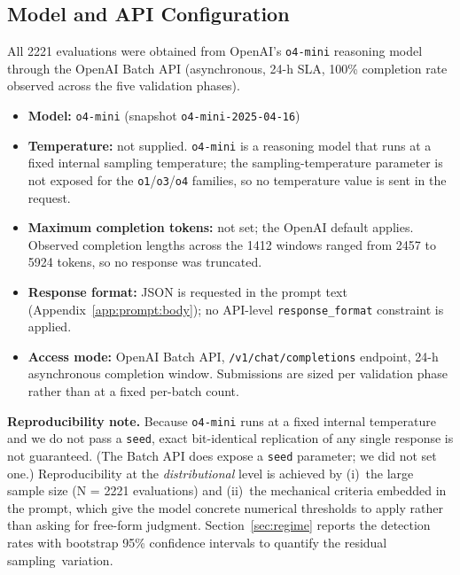 \documentclass[jrfm,article,accept,moreauthors,pdftex]{Definitions/mdpi}
\begin{document}
\subsection{Model and API Configuration}
\label{app:prompt:config}

All 2221 evaluations were obtained from OpenAI's \texttt{o4-mini}
reasoning model through the OpenAI Batch API (asynchronous, 24-h SLA,
100\% completion rate observed across the five validation phases).



\begin{itemize}
    \item \textbf{Model:} \texttt{o4-mini} (snapshot
          \texttt{o4-mini-2025-04-16})
    \item \textbf{Temperature:} not supplied. \texttt{o4-mini} is a
          reasoning model that runs at a fixed internal sampling
          temperature; the sampling-temperature parameter is not
          exposed for the \texttt{o1}/\texttt{o3}/\texttt{o4} families,
          so no temperature value is sent in the request.
    \item \textbf{Maximum completion tokens:} not set; the OpenAI
          default applies. Observed completion lengths across the
          1412 windows ranged from 2457 to 5924 tokens, so no response
          was truncated.
    \item \textbf{Response format:} JSON is requested in the prompt
          text (Appendix~\ref{app:prompt:body}); no API-level
          \texttt{response\_format} constraint is applied.
    \item \textbf{Access mode:} OpenAI Batch API,
          \texttt{/v1/chat/completions} endpoint, 24-h asynchronous
          completion window. Submissions are sized per validation phase
          rather than at a fixed per-batch count.
\end{itemize}

\noindent\textbf{{Reproducibility note.}} %
Because \texttt{o4-mini} runs at a fixed internal temperature and we do
not pass a \texttt{seed}, exact bit-identical replication of any single
response is not guaranteed. (The Batch API does expose a \texttt{seed}
parameter; we did not set one.)
Reproducibility at the \emph{distributional} level is achieved by
(i)~the large sample size ({N} %
 = 2221 evaluations) and
(ii)~the mechanical criteria embedded in the prompt, which give the
model concrete numerical thresholds to apply rather than asking for
free-form judgment. Section~\ref{sec:regime} reports the detection rates
with bootstrap 95\% confidence intervals to quantify the residual
sampling~variation.
\end{document}
